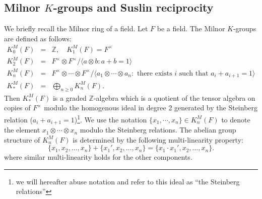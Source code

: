 \documentclass[12pt,amstex,amssymb]{article}
\theoremstyle{plain}
\theoremstyle{definition}
\def\g{\gamma}
\def\cS{{\cal S}}
\def\Z{{\mathbb Z}}
\def\g{\gamma}
\newcommand{\bea}{\begin{eqnarray}}
\newcommand{\eea}{\end{eqnarray}}
\newcommand{\Dist}{\operatorname{Dist}}
\begin{document}
%





\subsection{Milnor $K$-groups and Suslin reciprocity}

We briefly recall the Milnor ring of a field.
Let $F$ be a field. The Milnor $K$-groups are defined as follows:
\begin{eqnarray*}
K^M_0(F) &=& \Z, \quad K^M_1(F) = F^\times \\
K^M_2(F) &=& F^\times \otimes F^\times / \langle a\otimes b :  a+b= 1 \rangle \\
K^M_n(F) &=& F^\times \otimes \cdots \otimes F^\times / \langle a_1 \otimes \cdots \otimes a_n
 : \text{ there exists } i \text { such that } a_i+a_{i+1}= 1 \rangle \\
 K^M_\ast(F) &=& \bigoplus_{n\geq 0} K^M_n(F).
\end{eqnarray*} 
Then $K^M_\ast(F)$ is a graded $\Z$-algebra which is a quotient of the tensor algebra on copies of $F^\times$ modulo the homogenous ideal in degree 2 generated by the Steinberg relation ($a_i+a_{i+1}=1$)\footnote{we will hereafter abuse notation and refer to this ideal as ``the Steinberg relations''}.
  We use the notation $\{x_1, \cdots, x_n\} \in K^M_n(F)$ to denote the element $x_1\otimes \cdots \otimes x_n$ modulo the Steinberg relations.  
The abelian group structure of $K^M_n(F)$ is determined by the following multi-linearity property:
$$
\{x_1, x_2, \ldots, x_n\} +\{x_1', x_2, \ldots, x_n  \}=\{x_1 \cdot x_1', x_2, \ldots, x_n\}.
$$
where similar multi-linearity holds for the other components. 
\end{document}
